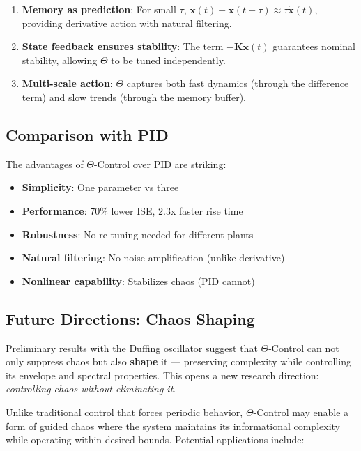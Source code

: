 \documentclass[12pt,a4paper]{article}
\begin{document}
\begin{enumerate}
    \item \textbf{Memory as prediction}: For small $\tau$, 
    $\mathbf{x}(t)-\mathbf{x}(t-\tau) \approx \tau\dot{\mathbf{x}}(t)$, 
    providing derivative action with natural filtering.
    
    \item \textbf{State feedback ensures stability}: The term 
    $-\mathbf{K}\mathbf{x}(t)$ guarantees nominal stability, allowing 
    $\Theta$ to be tuned independently.
    
    \item \textbf{Multi-scale action}: $\Theta$ captures both fast 
    dynamics (through the difference term) and slow trends (through 
    the memory buffer).
\end{enumerate}

\subsection{Comparison with PID}

The advantages of $\Theta$-Control over PID are striking:

\begin{itemize}
    \item \textbf{Simplicity}: One parameter vs three
    \item \textbf{Performance}: 70\% lower ISE, 2.3x faster rise time
    \item \textbf{Robustness}: No re-tuning needed for different plants
    \item \textbf{Natural filtering}: No noise amplification (unlike derivative)
    \item \textbf{Nonlinear capability}: Stabilizes chaos (PID cannot)
\end{itemize}

\subsection{Future Directions: Chaos Shaping}

Preliminary results with the Duffing oscillator suggest that 
$\Theta$-Control can not only suppress chaos but also 
\textbf{shape} it — preserving complexity while controlling 
its envelope and spectral properties. This opens a new 
research direction: \textit{controlling chaos without 
eliminating it}.

Unlike traditional control that forces periodic behavior, 
$\Theta$-Control may enable a form of guided chaos where 
the system maintains its informational complexity while 
operating within desired bounds. Potential applications 
include:
\end{document}
